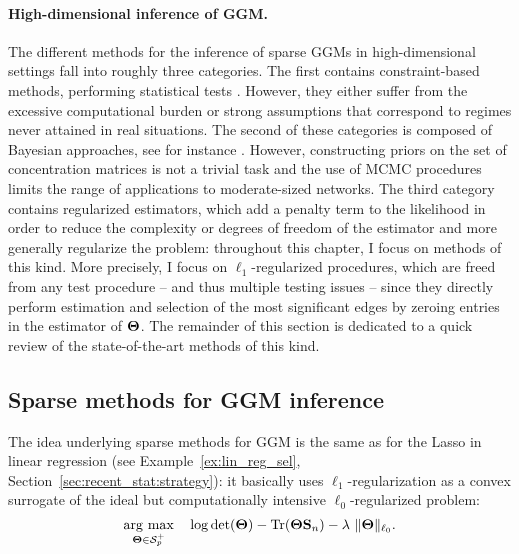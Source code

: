 \paragraph*{High-dimensional inference of GGM.}  The different methods
for the  inference of  sparse GGMs  in high-dimensional  settings fall
into roughly  three categories.   The first  contains constraint-based
methods,            performing            statistical            tests
\cite{2006_JMLR_Castelo,2007_SS_drton,2008_JSPI_drton,2011_BMC_Kiiveri,2006_SAGMB_Wille}.
However, they  either suffer  from the excessive  computational burden
\cite{2006_JMLR_Castelo,2006_SAGMB_Wille}   or    strong   assumptions
\cite{2007_SS_drton,2008_JSPI_drton} that correspond  to regimes never
attained  in  real situations.   The  second  of these  categories  is
composed     of    Bayesian     approaches,    see     for    instance
\cite{2004_JMVA_Dobra,2005_SS_Dobra,rau2012reverse,schwaller2015tree}.
However, constructing priors  on the set of  concentration matrices is
not a trivial task and the use  of MCMC procedures limits the range of
applications to moderate-sized networks.   The third category contains
regularized estimators, which add a  penalty term to the likelihood in
order to reduce the complexity or  degrees of freedom of the estimator
and more generally regularize the  problem: throughout this chapter, I
focus  on  methods   of  this  kind.   More  precisely,   I  focus  on
$\ell_1$-regularized  procedures,  which  are   freed  from  any  test
procedure -- and  thus multiple testing issues --  since they directly
perform  estimation and  selection of  the most  significant edges  by
zeroing entries in the estimator  of $\boldsymbol\Theta$.  The remainder of this
section is dedicated to a quick review of the state-of-the-art methods
of this kind.

\subsection{Sparse methods for GGM inference}
\label{sec:sparseGGM}

The idea  underlying sparse  methods for  GGM is the  same as  for the
Lasso   in   linear  regression   (see   Example~\ref{ex:lin_reg_sel},
Section~\ref{sec:recent_stat:strategy}): it basically uses 
$\ell_1$-regularization  as  a  convex  surrogate  of  the  ideal  but
computationally intensive $\ell_0$-regularized problem:
\begin{equation}
  \argmax_{\invcov  \in \mathcal{S}_p^+}\quad
  \log \det(\invcov) - \trace(\invcov \empcov) - \lambda\ 
  \|\invcov\|_{\ell_0}.
  \label{eq:ell0}
\end{equation}


